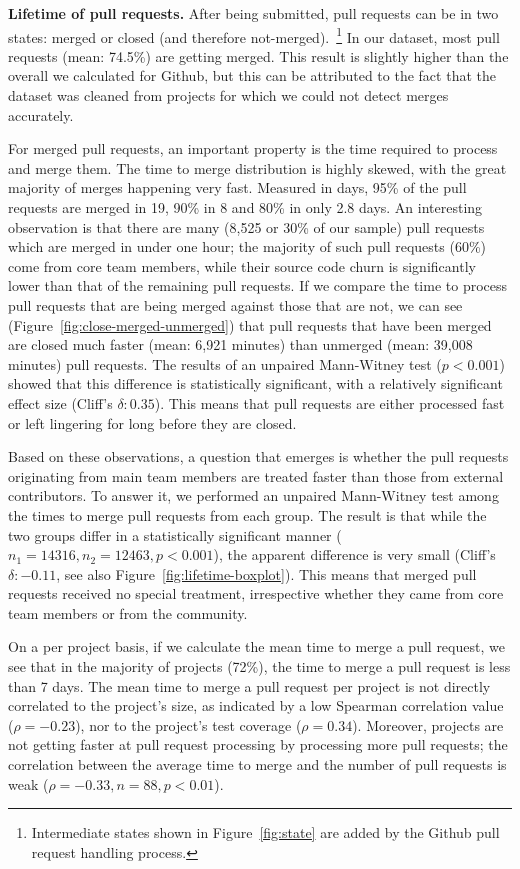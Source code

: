 \documentclass{acm_proc_article-sp}
\begin{document}
\textbf{Lifetime of pull requests.}
After being submitted, pull requests can be in two states: merged or closed
(and therefore not-merged).~\footnote{Intermediate states shown in
Figure~\ref{fig:state} are added by the Github pull request handling process.} 
In our dataset, most pull requests (mean: 74.5\%) are getting
merged. This result is slightly higher than the overall we calculated for
Github, but this can be attributed to the fact that the dataset was cleaned
from projects for which we could not detect merges accurately. 

For merged pull requests, an important property is the time required to process
and merge them. The time to merge distribution is highly skewed, with the great
majority of merges happening very fast. Measured in days, 95\% of the pull
requests are merged in 19, 90\% in 8 and 80\% in only 2.8 days. An interesting
observation is that there are many (8,525 or 30\% of our sample) pull requests
which are merged in under one hour; the majority of such pull requests (60\%)
come from core team members, while their source code churn is significantly
lower than that of the remaining pull requests. If we compare the time to
process pull requests that are being merged against those that are not, we can
see (Figure~\ref{fig:close-merged-unmerged}) that pull requests that have been
merged are closed much faster (mean: 6,921 minutes) than unmerged (mean: 39,008
minutes) pull requests.
The results of an unpaired Mann-Witney test ($p < 0.001$) showed that this difference is statistically significant, with a relatively
significant effect size (Cliff's $\delta: 0.35$). This means that pull requests
are either processed fast or left lingering for long before they are closed.

Based on these observations, a question that emerges is
whether the pull requests originating from main team members are treated faster
than those from external contributors. To answer it, we performed an unpaired
Mann-Witney test among the times to merge pull requests from each group. The
result is that while the two groups differ in a statistically significant manner
($n_1 = 14316, n_2 = 12463, p < 0.001$), the apparent difference is very small
(Cliff's $\delta: -0.11$, see also Figure~\ref{fig:lifetime-boxplot}). This
means that merged pull requests received no special treatment, irrespective
whether they came from core team members or from the community.

On a per project basis, if we calculate the mean time to merge a pull request,
we see that in the majority of projects (72\%), the time to merge a pull request
is less than 7 days. The mean time to merge a pull request per project is not
directly correlated to the project's size, as indicated by a low Spearman
correlation value ($\rho = -0.23$), nor to the project's test coverage ($\rho =
0.34$). Moreover, projects are not getting faster at pull request processing by
processing more pull requests; the correlation between the average time to merge
and the number of pull requests is weak ($\rho = -0.33, n = 88, p < 0.01$).
\end{document}
